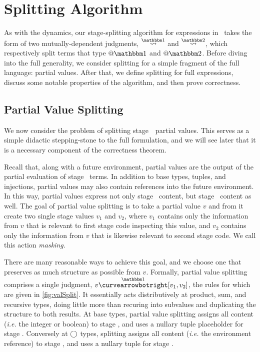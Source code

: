 
\section{Splitting Algorithm}
\label{sec:splitting}

As with the dynamics, our stage-splitting algorithm for expressions in \lang\ takes 
the form of two mutually-dependent judgments, $\splitonesym$ and $\splittwosym$, 
which respectively split terms that type $@ \bbone$ and $@ \bbtwo$. 
Before diving into the full generality, we consider splitting for a simple fragment of the full language: partial values.
After that, we define splitting for full expressions, discuss some notable properties of the algorithm, and then prove correctness.

\subsection{Partial Value Splitting}


We now consider the problem of splitting stage~\bbone\ partial values.
This serves as a simple didactic stepping-stone to the full formulation, 
and we will see later that it is a necessary component of the correctness theorem.

Recall that, along with a future environment, partial values are the output of the partial evaluation of stage \bbone\ terms.
In addition to base types, tuples, and injections, partial values may also contain references into the future environment.
In this way, partial values express not only stage \bbone\ content, but stage \bbtwo\ content as well.
The goal of partial value splitting is to take a partial value $v$ and from it create two single stage values $v_1$ and $v_2$,
where $v_1$ contains only the information from $v$ that is relevant to first stage code inspecting this value, 
and $v_2$ contains only the information from $v$ that is likewise relevant to second stage code.
We call this action {\em masking}.

  There are many reasonable ways to achieve this goal, and
we choose one that preserves as much structure as possible from $v$.
Formally, partial value splitting comprises a single judgment, $v
\vsplito [v_1,v_2]$, the rules for which are given in
\cref{fig:valSplit}.  It essentially acts distributively at product,
sum, and recursive types, doing little more than recuring into
subvalues and duplicating the structure to both results.  At base
types, partial value splitting assigns all content ({\em i.e.} the
integer or boolean) to stage \bbone, and uses a nullary tuple
placeholder for stage \bbtwo.  Conversely at $\bigcirc$ types, splitting
assigns all content ({\em i.e.} the environment reference) to stage
\bbtwo, and uses a nullary tuple for stage \bbone.


